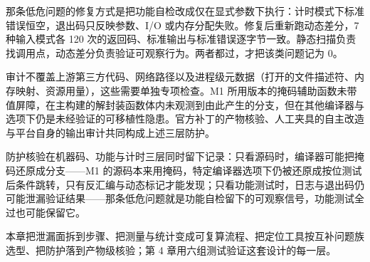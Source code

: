 那条低危问题的修复方式是把功能自检改成仅在显式参数下执行：计时模式下标准错误恒空，退出码只反映参数、I/O 或内存分配失败。修复后重新跑动态差分，7 种输入模式各 120 次的返回码、标准输出与标准错误逐字节一致。静态扫描负责找调用点，动态差分负责验证可观察行为。两者都过，才把该类问题记为 0。

审计不覆盖上游第三方代码、网络路径以及进程级元数据（打开的文件描述符、内存映射、资源用量），这些需要单独专项检查。M1 所用版本的掩码辅助函数未带值屏障，在主构建的解封装函数体内未观测到由此产生的分支，但在其他编译器与选项下仍是未经验证的可移植性隐患。官方补丁的产物核验、人工夹具的自主改造与平台自身的输出审计共同构成上述三层防护。

防护核验在机器码、功能与计时三层同时留下记录：只看源码时，编译器可能把掩码还原成分支——M1 的源码本来用掩码，特定编译器选项下仍被还原成按位测试后条件跳转，只有反汇编与动态标记才能发现；只看功能测试时，日志与退出码仍可能泄漏验证结果——那条低危问题就是功能自检留下的可观察信号，功能测试全过也可能保留它。

本章把泄漏面拆到步骤、把测量与统计变成可复算流程、把定位工具按互补问题族选型、把防护落到产物级核验；第 4 章用六组测试验证这套设计的每一层。